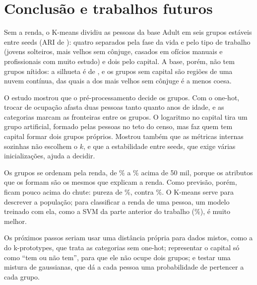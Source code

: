 \section{Conclusão e trabalhos futuros}

Sem a renda, o K-means dividiu as \clLinhas{} pessoas da base Adult em seis grupos estáveis entre seeds (ARI de \clAriSeis): quatro separados pela fase da vida e pelo tipo de trabalho (jovens solteiros, mais velhos sem cônjuge, casados em ofícios manuais e profissionais com muito estudo) e dois pelo capital. A base, porém, não tem grupos nítidos: a silhueta é de \clSilSeis, e os grupos sem capital são regiões de uma nuvem contínua, das quais a dos mais velhos sem cônjuge é a menos coesa.

O estudo mostrou que o pré-processamento decide os grupos. Com o one-hot, trocar de ocupação afasta duas pessoas tanto quanto \clTrocaAnos{} anos de idade, e as categorias marcam as fronteiras entre os grupos. O logaritmo no capital tira um grupo artificial, formado pelas \clTeto{} pessoas no teto do censo, mas faz quem tem capital formar dois grupos próprios. Mostrou também que as métricas internas sozinhas não escolhem o $k$, e que a estabilidade entre seeds, que exige várias inicializações, ajuda a decidir.

Os grupos se ordenam pela renda, de \clPosUm\% a \clPosSeis\% acima de 50 mil, porque os atributos que os formam são os mesmos que explicam a renda. Como previsão, porém, ficam pouco acima do chute: pureza de \clPureza\%, contra \clChute\%. O K-means serve para descrever a população; para classificar a renda de uma pessoa, um modelo treinado com ela, como a SVM da parte anterior do trabalho (\clSvmAcc\%), é muito melhor.

Os próximos passos seriam usar uma distância própria para dados mistos, como a do k-prototypes, que trata as categorias sem one-hot; representar o capital só como ``tem ou não tem'', para que ele não ocupe dois grupos; e testar uma mistura de gaussianas, que dá a cada pessoa uma probabilidade de pertencer a cada grupo.
